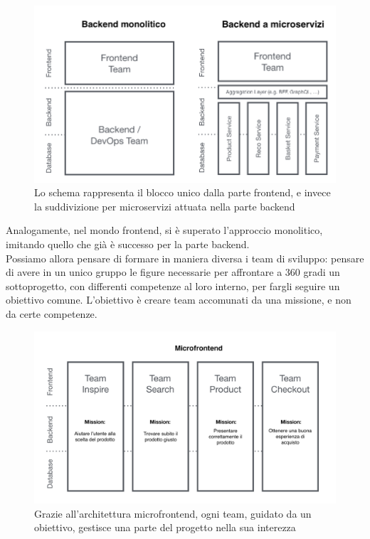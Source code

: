 \begin{figure}[H]
    \centering
    \includegraphics[width=140mm]{img/monolite}
    \caption{Lo schema rappresenta il blocco unico dalla parte frontend, e invece la suddivizione per 
    microservizi attuata nella parte backend}
  \end{figure}
Analogamente, nel mondo frontend, si è superato l'approccio monolitico, imitando quello che già è 
successo per la parte backend.
\\
Possiamo allora pensare di formare in maniera diversa i team di sviluppo: pensare di avere in un unico gruppo
le figure necessarie per affrontare a 360 gradi un sottoprogetto, con differenti competenze al
loro interno, per fargli seguire un obiettivo comune. L'obiettivo è creare team accomunati da una missione, e non da certe competenze.
\begin{figure}[H]
    \centering
    \includegraphics[width=140mm]{img/microfrontend}
    \caption{Grazie all'architettura microfrontend, ogni team, guidato da un obiettivo, gestisce una 
    parte del progetto nella sua interezza}
  \end{figure}
